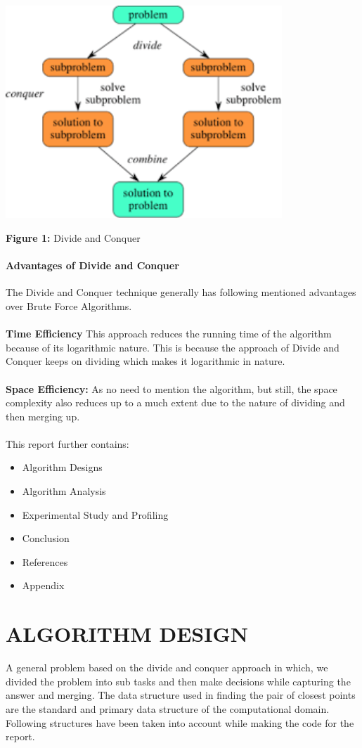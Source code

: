 \documentclass[10pt]{article}
\begin{document}
\begin{multicols*}{2}
\includegraphics[width=\columnwidth, height=8cm]{dac.png}\begin{center}\textbf{Figure 1:} Divide and Conquer\end{center}


\paragraph{Advantages of Divide and Conquer}
The Divide and Conquer technique generally has following mentioned advantages over Brute Force Algorithms.\\\\
\textbf{Time Efficiency} This approach reduces the running time of the algorithm because of its logarithmic nature. This is because the approach of Divide and Conquer keeps on dividing which makes it logarithmic in nature.\\\\
\textbf{Space Efficiency:} As no need to mention the algorithm,  but still, the space complexity also reduces up to a much extent due to the nature of dividing and then merging up.\\

\\This report further contains:
\begin{itemize}
\item 	Algorithm  Designs
\item 	Algorithm  Analysis
\item 	Experimental Study and Profiling
\item 	Conclusion
\item 	References
\item 	Appendix
\end{itemize}

\section*{ALGORITHM DESIGN}
A general problem based on the divide and conquer approach in which, we divided the problem into sub tasks and then make decisions while capturing the answer and merging. The data structure used in finding the pair of closest points are the standard and primary data structure of the computational domain. Following structures have been taken into account while making the code for the report.


\end{multicols*}
\end{document}
